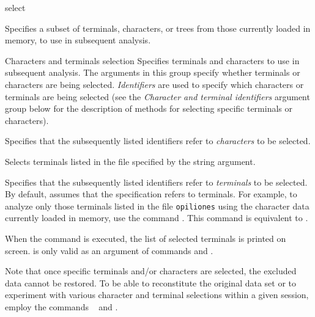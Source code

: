 
\begin{command}{select}{}


\begin{poydescription} 
Specifies a subset of terminals, characters, or trees from those
currently loaded in memory, to use in subsequent analysis.
\end{poydescription}


\begin{arguments}

\begin{argumentgroup}{Characters and terminals selection}
{Specifies terminals and characters to use in subsequent
analysis. The arguments in this group specify whether terminals 
or characters are being selected.
\emph{Identifiers} are used to specify which characters or
terminals are being selected (see
the \emph{Character and terminal identifiers} argument group below
for the description of methods for selecting specific terminals or characters).}

{Specifies that the subsequently listed identifiers
refer to \emph{characters} to be selected.}
{}

{Selects terminals listed in the file specified by the string argument.}
{}

{Specifies that the subsequently listed identifiers
refer to \emph{terminals} to be selected. By default, \poy
assumes that the specification refers to terminals. For example, to
analyze only those terminals listed in the file \texttt{opiliones} using
the character data currently loaded in memory, use the command 
. This command is
equivalent to .

\setlength{\parindent}{0.5cm}                
\indent 
When the command is executed, the list of selected terminals is
printed on screen.  is only valid as an
argument of commands  and .} 
{}

\begin{statement}
Note that once specific terminals and/or characters are selected, the excluded
data cannot be restored. To be able to reconstitute the original data set or to
experiment with various character and terminal selections within a given \poy
session, employ the commands ~ and .
\end{statement}


\end{argumentgroup}
\end{arguments}
\end{command}
